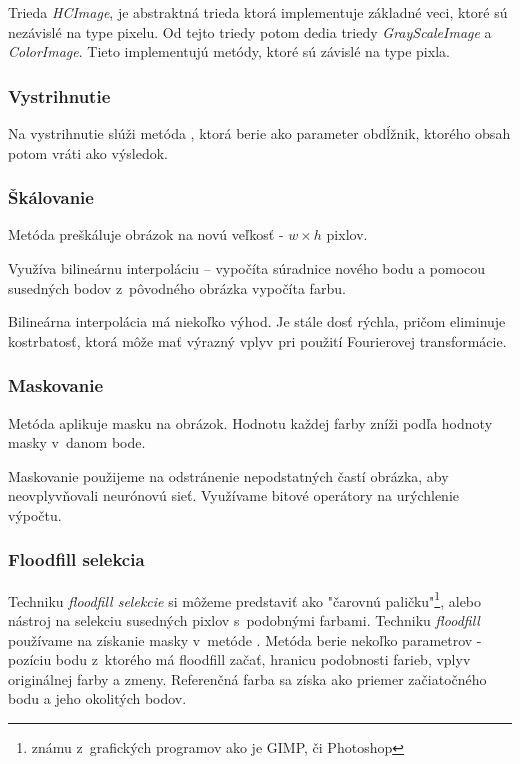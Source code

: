 Trieda \textit{HCImage}, je abstraktná trieda ktorá implementuje základné veci, ktoré sú nezávislé na type pixelu. Od tejto triedy potom dedia triedy \textit{GrayScaleImage} a \textit{ColorImage}. Tieto implementujú metódy, ktoré sú závislé na type pixla. 

\subsubsection{Vystrihnutie}
Na vystrihnutie slúži metóda , ktorá berie ako parameter obdĺžnik, ktorého obsah potom vráti ako výsledok. 

\subsubsection{Škálovanie}
Metóda  preškáluje obrázok na novú veľkosť - $w\times h$ pixlov.

Využíva bilineárnu interpoláciu -- vypočíta súradnice nového bodu a pomocou susedných bodov z~pôvodného obrázka vypočíta farbu.

Bilineárna interpolácia má niekoľko výhod. Je stále dosť rýchla, pričom eliminuje kostrbatosť, ktorá môže mať výrazný vplyv pri použití Fourierovej transformácie.

\subsubsection{Maskovanie}

Metóda  aplikuje masku na obrázok. Hodnotu každej farby zníži podľa hodnoty masky v~danom bode.

Maskovanie použijeme na odstránenie nepodstatných častí obrázka, aby neovplyvňovali neurónovú sieť. Využívame bitové operátory na urýchlenie výpočtu. %

\subsubsection{Floodfill selekcia}
Techniku \textit{floodfill selekcie} si môžeme predstaviť ako "čarovnú paličku"\footnote{známu z~grafických programov ako je GIMP, či Photoshop}, alebo nástroj na selekciu susedných pixlov s~podobnými farbami. Techniku \textit{floodfill} používame na získanie masky v~metóde . Metóda berie nekoľko parametrov - pozíciu bodu z~ktorého má floodfill začať, hranicu podobnosti farieb, vplyv originálnej farby a zmeny. Referenčná farba sa získa ako priemer začiatočného bodu a jeho okolitých bodov. 

